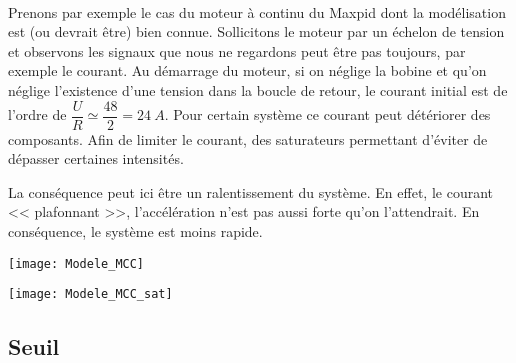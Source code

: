\begin{exemple} ~\\

Prenons par exemple le cas du moteur à continu du Maxpid dont la modélisation est (ou devrait être)  bien connue. Sollicitons le moteur par un échelon de tension et observons les signaux que nous ne regardons peut être pas toujours, par exemple le courant. 
Au démarrage du moteur, si on néglige la bobine et qu'on néglige l'existence d'une tension dans la boucle de retour, le courant initial est de l'ordre de $\dfrac{U}{R}\simeq \dfrac{48}{2}=\SI{24}{A}$. Pour certain système ce courant peut détériorer des composants. Afin de limiter le courant, des saturateurs permettant d'éviter de dépasser certaines intensités. 

La conséquence peut ici être un ralentissement du système. En effet, le courant << plafonnant >>, l'accélération n'est pas aussi forte qu'on l'attendrait. En conséquence, le système est moins rapide. 
\begin{center}
\texttt{[image: Modele\_MCC]}

\texttt{[image: Modele\_MCC\_sat]}
\end{center}

\end{exemple}

\subsection{Seuil}

